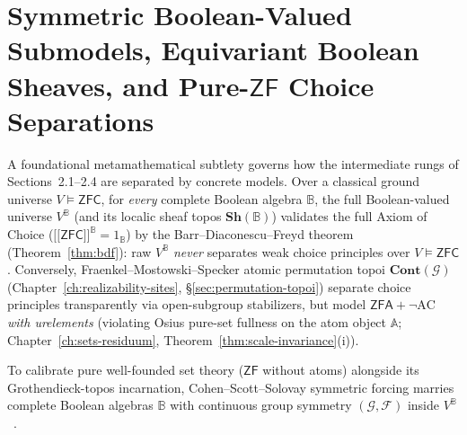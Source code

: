 \documentclass[10pt,twoside,openright]{book}
\providecommand{\llbracket}{\mathopen{[\![}}
\providecommand{\rrbracket}{\mathclose{]\!]}}
\theoremstyle{crmplain}
\theoremstyle{crmdef}
\theoremstyle{crmremark}
\begin{document}
\section{\texorpdfstring{Symmetric Boolean-Valued Submodels, Equivariant Boolean Sheaves, and Pure-$\mathsf{ZF}$ Choice Separations}{Symmetric Boolean-Valued Submodels, Equivariant Boolean Sheaves, and Pure-ZF Choice Separations}}\label{sec:symmetric-bv-zf}

A foundational metamathematical subtlety governs how the intermediate rungs of Sections~2.1--2.4 are separated by concrete models. Over a classical ground universe $V \models \mathsf{ZFC}$, for \emph{every} complete Boolean algebra $\mathbb{B}$, the full Boolean-valued universe $V^{\mathbb{B}}$ (and its localic sheaf topos $\mathbf{Sh}(\mathbb{B})$) validates the full Axiom of Choice ($\llbracket \mathsf{ZFC} \rrbracket^{\mathbb{B}} = 1_{\mathbb{B}}$) by the Barr--Diaconescu--Freyd theorem (Theorem~\ref{thm:bdf}): raw $V^{\mathbb{B}}$ \emph{never} separates weak choice principles over $V \models \mathsf{ZFC}$. Conversely, Fraenkel--Mostowski--Specker atomic permutation topoi $\mathbf{Cont}(\mathcal{G})$ (Chapter~\ref{ch:realizability-sites}, \S\ref{sec:permutation-topoi}) separate choice principles transparently via open-subgroup stabilizers, but model $\mathsf{ZFA} + \neg\mathrm{AC}$ \emph{with urelements} (violating Osius pure-set fullness on the atom object $\mathbb{A}$; Chapter~\ref{ch:sets-residuum}, Theorem~\ref{thm:scale-invariance}(i)).

To calibrate pure well-founded set theory ($\mathsf{ZF}$ without atoms) alongside its Grothendieck-topos incarnation, Cohen--Scott--Solovay symmetric forcing marries complete Boolean algebras $\mathbb{B}$ with continuous group symmetry $(\mathcal{G}, \mathcal{F})$ inside $V^{\mathbb{B}}$~\cite[Ch.~5]{Jech73}.
\end{document}

